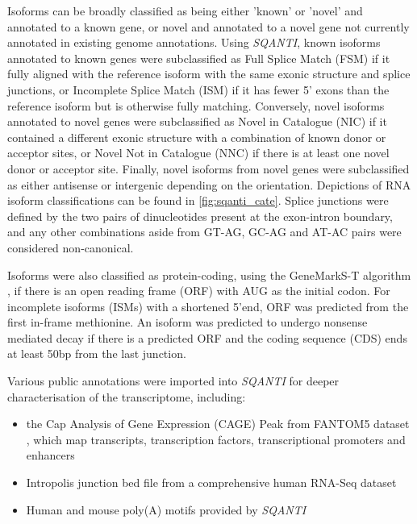 Isoforms can be broadly classified as being either 'known' or 'novel' and annotated to a known gene, or novel and annotated to a novel gene not currently annotated in existing genome annotations. Using \textit{SQANTI}, known isoforms annotated to known genes were subclassified as Full Splice Match (FSM) if it fully aligned with the reference isoform with the same exonic structure and splice junctions, or Incomplete Splice Match (ISM) if it has fewer 5’ exons than the reference isoform but is otherwise fully matching. Conversely, novel isoforms annotated to novel genes were subclassified as Novel in Catalogue (NIC) if it contained a different exonic structure with a combination of known donor or acceptor sites, or Novel Not in Catalogue (NNC) if there is at least one novel donor or acceptor site. Finally, novel isoforms from novel genes were subclassified as either antisense or intergenic depending on the orientation. Depictions of RNA isoform classifications can be found in \cref{fig:sqanti_cate}. Splice junctions were defined by the two pairs of dinucleotides present at the exon-intron boundary, and any other combinations aside from GT-AG, GC-AG and AT-AC pairs were considered non-canonical. 

Isoforms were also classified as protein-coding, using the GeneMarkS-T algorithm \cite{Tang2015}, if there is an open reading frame (ORF) with AUG as the initial codon. For incomplete isoforms (ISMs) with a shortened 5'end, ORF was predicted from the first in-frame methionine. An isoform was predicted to undergo nonsense mediated decay if there is a predicted ORF and the coding sequence (CDS) ends at least 50bp from the last junction. 

Various public annotations were imported into \textit{SQANTI} for deeper characterisation of the transcriptome, including:
\begin{itemize}
	\item the Cap Analysis of Gene Expression (CAGE) Peak from FANTOM5 dataset \cite{Lizio2019}, which map transcripts, transcription factors, transcriptional promoters and enhancers
	\item Intropolis junction bed file\cite{Nellore2016} from a comprehensive human RNA-Seq dataset
	\item Human and mouse poly(A) motifs provided by \textit{SQANTI}	 
\end{itemize}


